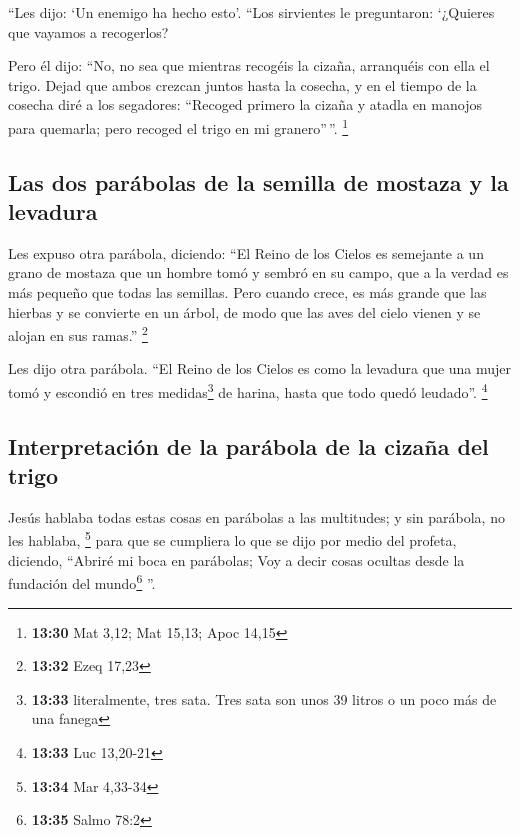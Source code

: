 ``Les dijo: `Un enemigo ha hecho esto'. ``Los sirvientes
le preguntaron: `¿Quieres que vayamos a recogerlos?

 Pero él dijo: ``No, no sea que mientras recogéis la
cizaña, arranquéis con ella el trigo.  Dejad que ambos
crezcan juntos hasta la cosecha, y en el tiempo de la cosecha diré a los
segadores: ``Recoged primero la cizaña y atadla en manojos para
quemarla; pero recoged el trigo en mi granero''\,''. \footnote{\textbf{13:30}
  Mat 3,12; Mat 15,13; Apoc 14,15}

\hypertarget{las-dos-paruxe1bolas-de-la-semilla-de-mostaza-y-la-levadura}{%
\subsection{Las dos parábolas de la semilla de mostaza y la
levadura}\label{las-dos-paruxe1bolas-de-la-semilla-de-mostaza-y-la-levadura}}

 Les expuso otra parábola, diciendo: ``El Reino de los
Cielos es semejante a un grano de mostaza que un hombre tomó y sembró en
su campo,  que a la verdad es más pequeño que todas las
semillas. Pero cuando crece, es más grande que las hierbas y se
convierte en un árbol, de modo que las aves del cielo vienen y se alojan
en sus ramas.'' \footnote{\textbf{13:32} Ezeq 17,23}

 Les dijo otra parábola. ``El Reino de los Cielos es como
la levadura que una mujer tomó y escondió en tres medidas\footnote{\textbf{13:33}
  literalmente, tres sata. Tres sata son unos 39 litros o un poco más de
  una fanega} de harina, hasta que todo quedó leudado''. \footnote{\textbf{13:33}
  Luc 13,20-21}

\hypertarget{interpretaciuxf3n-de-la-paruxe1bola-de-la-cizauxf1a-del-trigo}{%
\subsection{Interpretación de la parábola de la cizaña del
trigo}\label{interpretaciuxf3n-de-la-paruxe1bola-de-la-cizauxf1a-del-trigo}}

 Jesús hablaba todas estas cosas en parábolas a las
multitudes; y sin parábola, no les hablaba, \footnote{\textbf{13:34} Mar
  4,33-34}  para que se cumpliera lo que se dijo por
medio del profeta, diciendo, ``Abriré mi boca en parábolas; Voy a decir
cosas ocultas desde la fundación del mundo\footnote{\textbf{13:35} Salmo
  78:2} ''.

